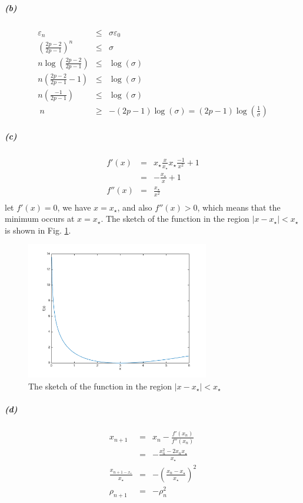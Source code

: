 \documentclass{article}
\begin{document}
\subparagraph*{(b)}
\begin{eqnarray*}
	\varepsilon_n &\le& \sigma \varepsilon_0\\
	\left(\frac{2p-2}{2p-1}\right)^n &\le& \sigma\\
	n\log\left(\frac{2p-2}{2p-1}\right) &\le& \log(\sigma)\\
	n(\frac{2p-2}{2p-1}-1) &\le& \log(\sigma)\\
	n(\frac{-1}{2p-1}) &\le& \log(\sigma)\\\
	n &\ge& -(2p-1)\log(\sigma) = (2p-1)\log(\frac{1}{\sigma})
\end{eqnarray*}

\subparagraph*{(c)}
\begin{eqnarray*}
	f'(x) &=& x_{\star} \frac{x}{x_{\star}} x_{\star} \frac{-1}{x^2} + 1\\
	&=& -\frac{x_{\star}}{x} + 1\\
	f''(x) &=& \frac{x_{\star}}{x^2}\\
\end{eqnarray*}
let $f'(x)=0$, we have $x = x_{\star}$, and also $f''(x)>0$, which means that the minimum occurs at $x = x_{\star}$. The sketch of the function in the region $|x-x_{\star}|<x_{\star}$ is shown in Fig. \ref{hw4.4}.

\begin{figure}
	\centering
	\includegraphics[width=8cm]{hw44.png}
	\caption{The sketch of the function in the region $|x-x_{\star}|<x_{\star}$}
	\label{hw4.4}
\end{figure}
\subparagraph*{(d)}
\begin{eqnarray*}
	x_{n+1}&=& x_{n} - \frac{f'(x_n)}{f''(x_n)}\\
	&=&  - \frac{x_n^2-2x_n x_{\star}}{x_{\star}}\\
	\frac{x_{n+1-x_{\star}}}{x_{\star}} &=& - \left(\frac{x_n - x_{\star}}{x_{\star}}\right)^2\\
	\rho_{n+1} &=& -\rho_n^2
\end{eqnarray*}
\end{document}
